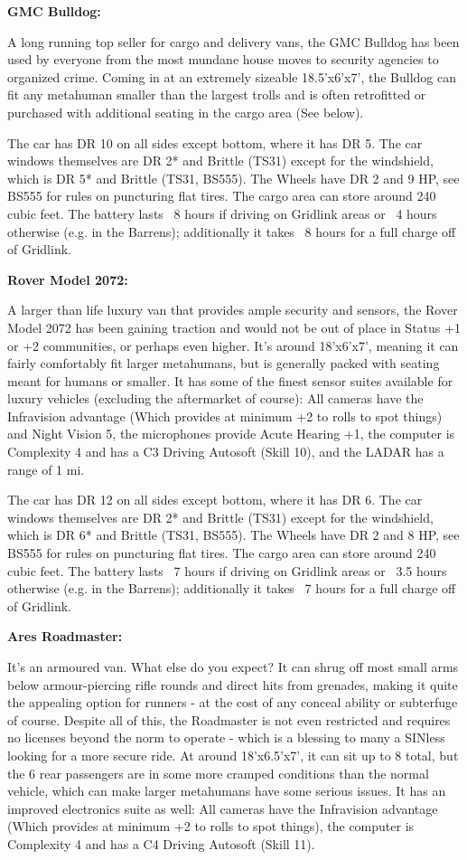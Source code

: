 \textbf{GMC Bulldog:}

A long running top seller for cargo and delivery vans, the GMC Bulldog has been used by everyone from the most mundane house moves to security agencies to organized crime. Coming in at an extremely sizeable 18.5'x6'x7', the Bulldog can fit any metahuman smaller than the largest trolls and is often retrofitted or purchased with additional seating in the cargo area (See below).

The car has DR 10 on all sides except bottom, where it has DR 5. The car windows themselves are DR 2* and Brittle (TS31) except for the windshield, which is DR 5* and Brittle (TS31, BS555). The Wheels have DR 2 and 9 HP, see BS555 for rules on puncturing flat tires. The cargo area can store around 240 cubic feet. The battery lasts ~8 hours if driving on Gridlink areas or ~4 hours otherwise (e.g. in the Barrens); additionally it takes ~8 hours for a full charge off of Gridlink.

\textbf{Rover Model 2072:}

A larger than life luxury van that provides ample security and sensors, the Rover Model 2072 has been gaining traction and would not be out of place in Status +1 or +2 communities, or perhaps even higher. It's around 18'x6'x7', meaning it can fairly comfortably fit larger metahumans, but is generally packed with seating meant for humans or smaller. It has some of the finest sensor suites available for luxury vehicles (excluding the aftermarket of course): All cameras have the Infravision advantage (Which provides at minimum +2 to rolls to spot things) and Night Vision 5, the microphones provide Acute Hearing +1, the computer is Complexity 4 and has a C3 Driving Autosoft (Skill 10), and the LADAR has a range of 1 mi.

The car has DR 12 on all sides except bottom, where it has DR 6. The car windows themselves are DR 2* and Brittle (TS31) except for the windshield, which is DR 6* and Brittle (TS31, BS555). The Wheels have DR 2 and 8 HP, see BS555 for rules on puncturing flat tires. The cargo area can store around 240 cubic feet. The battery lasts ~7 hours if driving on Gridlink areas or ~3.5 hours otherwise (e.g. in the Barrens); additionally it takes ~7 hours for a full charge off of Gridlink.

\textbf{Ares Roadmaster:}

It's an armoured van. What else do you expect? It can shrug off most small arms below armour-piercing rifle rounds and direct hits from grenades, making it quite the appealing option for runners - at the cost of any conceal ability or subterfuge of course. Despite all of this, the Roadmaster is not even restricted and requires no licenses beyond the norm to operate - which is a blessing to many a SINless looking for a more secure ride. At around 18'x6.5'x7', it can sit up to 8 total, but the 6 rear passengers are in some more cramped conditions than the normal vehicle, which can make larger metahumans have some serious issues. It has an improved electronics suite as well: All cameras have the Infravision advantage (Which provides at minimum +2 to rolls to spot things), the computer is Complexity 4 and has a C4 Driving Autosoft (Skill 11).

